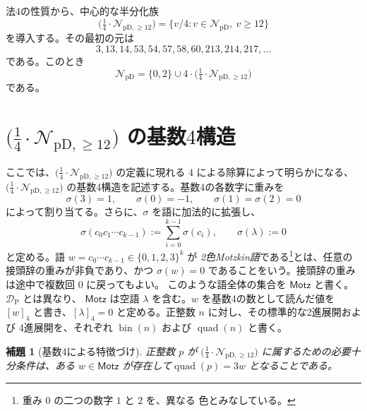 \documentclass[12pt]{ltjsarticle}
\theoremstyle{plain}
\newtheorem{lemma}[theorem]{補題}
\theoremstyle{definition}
\theoremstyle{plain}
\newcommand{\NpD}{\mathcal{N}_{\mathrm{pD}}}
\newcommand{\DP}{\mathcal{D}_{\mathrm{P}}}
\newcommand{\Pset}{%
  \bigl(\tfrac{1}{4}\cdot\mathcal{N}_{\mathrm{pD},\geq 12}\bigr)%
}
\begin{document}
法4の性質から、中心的な半分化族
\begin{equation}\label{eq:P-def}
 \Pset=\{v/4:v\in\NpD,\ v\geq12\}
\end{equation}
を導入する。その最初の元は
\[
 3,13,14,53,54,57,58,60,213,214,217,\ldots
\]
である。このとき
\begin{equation}\label{eq:NpD-decomp}
 \NpD=\{0,2\}\cup4\cdot\Pset
\end{equation}
である。

\section{\texorpdfstring{$\Pset$}{P} の基数\texorpdfstring{$4$}{4}構造}
\label{sec:base4}

ここでは、$\Pset$ の定義に現れる $4$ による除算によって明らかになる、
$\Pset$ の基数4構造を記述する。基数4の各数字に重みを
\[
  \sigma(3)=1,\qquad \sigma(0)=-1,\qquad
  \sigma(1)=\sigma(2)=0
\]
によって割り当てる。さらに、$\sigma$ を語に加法的に拡張し、
\[
 \sigma(c_0c_1\cdots c_{k-1})
 :=\sum_{i=0}^{k-1}\sigma(c_i),
 \qquad
 \sigma(\lambda):=0
\]
と定める。語 $w=c_0\cdots c_{k-1}\in\{0,1,2,3\}^{k}$ が
\emph{2色Motzkin語}である\footnote{重み $0$ の二つの数字 $1$ と $2$ を、異なる
色とみなしている。}とは、任意の接頭辞の重みが非負であり、かつ
$\sigma(w)=0$ であることをいう。接頭辞の重みは途中で複数回 $0$ に戻ってもよい。
このような語全体の集合を $\mathsf{Motz}$ と書く。$\DP$ とは異なり、
$\mathsf{Motz}$ は空語 $\lambda$ を含む。$w$ を基数4の数として読んだ値を $[w]_4$
と書き、$[\lambda]_4=0$ と定める。正整数 $n$ に対し、その標準的な2進展開および
4進展開を、それぞれ $\operatorname{bin}(n)$ および $\operatorname{quad}(n)$ と書く。

\begin{lemma}[基数4による特徴づけ]\label{lem:base4}
正整数 $p$ が $\Pset$ に属するための必要十分条件は、ある $w\in\mathsf{Motz}$ が存在して$ \operatorname{quad}(p)=3w$
となることである。
\end{lemma}
\end{document}

